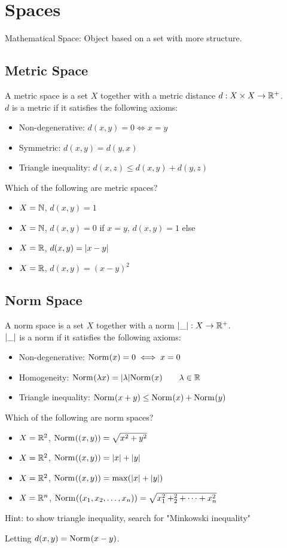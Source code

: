 \chapter{Spaces}
Mathematical Space: Object based on a set with more structure.
\section{Metric Space}
A metric space is a set $X$ together with a metric distance $d: X \times X \to \mathbb{R}^+$.\\
$d$ is a metric if it satisfies the following axioms:
\begin{itemize}
	\item Non-degenerative: $d(x,y)=0 \iff x=y$
	\item Symmetric: $d(x,y) = d(y,x)$
	\item Triangle inequality: $d(x,z) \leq d(x,y) + d(y,z)$
\end{itemize}
\begin{question}
	Which of the following are metric spaces?
	\begin{itemize}
		\item $X=\mathbb{N}$, $d(x,y)=1$
		\item $X=\mathbb{N}$, $d(x,y)=0$ if $x=y$, $d(x,y)=1$ else
		\item $X=\mathbb{R}$, $d(x,y) = | x-y |$
		\item $X=\mathbb{R}$, $d(x,y) = (x-y)^2$
	\end{itemize}
\end{question}

\section{Norm Space}
A norm space is a set $X$ together with a norm $| \_ |: X \to \mathbb{R}^+$.\\
$| \_ |$ is a norm if it satisfies the following axioms:
\begin{itemize}
	\item Non-degenerative: $\text{Norm}_{}(x)=0 \iff x=0$
	\item Homogeneity: $\text{Norm}_{}(\lambda x) = | \lambda | \text{Norm}_{}(x) \qquad \lambda \in \mathbb{R}$
	\item Triangle inequality: $\text{Norm}_{}(x+y) \leq \text{Norm}_{}(x) + \text{Norm}_{}(y)$
\end{itemize}
\begin{question}
	Which of the following are norm spaces?
	\begin{itemize}
		\item $X=\mathbb{R}^2$, $\text{Norm}_{}((x,y))=\sqrt{x^2+y^2}$
		\item $X=\mathbb{R}^2$, $\text{Norm}_{}((x,y))=| x |+| y |$
		\item $X=\mathbb{R}^2$, $\text{Norm}_{}((x,y))=\max(| x |+| y |)$
		\item $X=\mathbb{R}^n$, $\text{Norm}_{}((x_1,x_2,\dots,x_n))=\sqrt{x_1^2+_2^2+\dots+x_n^2}$
	\end{itemize}
\end{question}
Hint: to show triangle inequality, search for "Minkowski inequality"
\begin{property}
	Letting $d(x,y) = \text{Norm}_{}(x-y)$.
\end{property}

